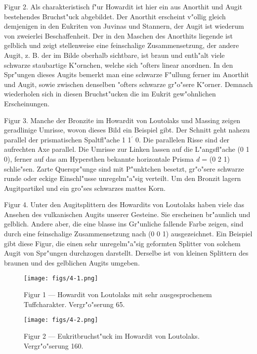 \documentclass[a4paper, 11pt, oneside, polutonikogreek, german]{article}
\begin{document}
Figur 2. Als charakteristisch f"ur Howardit ist hier ein aus Anorthit und Augit bestehendes Bruchst"uck abgebildet. Der Anorthit erscheint v"ollig gleich demjenigen in den Eukriten von Juvinas und Stannern, der Augit ist wiederum von zweierlei Beschaffenheit. Der in den Maschen des Anorthits liegende ist gelblich und zeigt stellenweise eine feinschalige Zusammensetzung, der andere Augit, z. B. der im Bilde oberhalb sichtbare, ist braun und enth"alt viele schwarze staubartige K"ornchen, welche sich "ofters linear anordnen. In den Spr"ungen dieses Augits bemerkt man eine schwarze F"ullung ferner im Anorthit und Augit, sowie zwischen denselben "ofters schwarze gr"o"sere K"orner. Demnach wiederholen sich in diesen Bruchst"ucken die im Eukrit gew"ohnlichen Erscheinungen.

Figur 3. Manche der Bronzite im Howardit von Loutolaks und Massing zeigen geradlinige Umrisse, wovon dieses Bild ein Beispiel gibt. Der Schnitt geht nahezu parallel der prismatischen Spaltfl"ache 1 1$^{\prime}$ 0. Die parallelen Risse sind der aufrechten Axe parallel. Die Umrisse zur Linken lassen auf die L"angsfl"ache (0 1 0), ferner auf das am Hypersthen bekannte horizontale Prisma \emph{d} = (0 2 1) schlie"sen. Zarte Querspr"unge sind mit P"unktchen besetzt, gr"o"sere schwarze runde oder eckige Einschl"usse unregelm"a"sig verteilt. Um den Bronzit lagern Augitpartikel und ein gro"ses schwarzes mattes Korn.

Figur 4. Unter den Augitsplittern des Howardits von Loutolaks haben viele das Ansehen des vulkanischen Augits unserer Gesteine. Sie erscheinen br"aunlich und gelblich. Andere aber, die eine blasse ins Gr"unliche fallende Farbe zeigen, sind durch eine feinschalige Zusammensetzung nach (0 0 1) ausgezeichnet. Ein Beispiel gibt diese Figur, die einen sehr unregelm"a"sig geformten Splitter von solchem Augit von Spr"ungen durchzogen darstellt. Derselbe ist von kleinen Splittern des braunen und des gelblichen Augits umgeben.
\clearpage

\vspace*{\fill}
\begin{figure}[H]
\centering
\texttt{[image: figs/4-1.png]}
\caption{\small Figur 1 --- Howardit von Loutolaks mit sehr ausgesprochenem Tuffcharakter. Vergr"o"serung 65.}
\end{figure}
\vspace*{\fill}
\clearpage

\vspace*{\fill}
\begin{figure}[H]
\centering
\texttt{[image: figs/4-2.png]}
\caption{\small Figur 2 --- Eukritbruchst"uck im Howardit von Loutolaks. Vergr"o"serung 160.}
\end{figure}
\vspace*{\fill}
\clearpage
\end{document}
